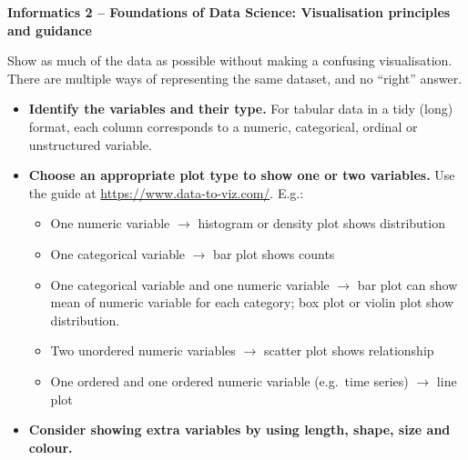 \documentclass[10pt]{article}
\newlength{\calloutparindent}
\newenvironment{callout}[2][standard]{
  \setlength{\calloutparindent}{\parindent}
  \begin{tcolorbox}[enhanced jigsaw,
    leftrule=.15mm, toprule=.15mm,
    colframe=quarto-callout-#1-color-frame, opacityback=0,
    colback=white, coltitle=black, rightrule=.15mm, breakable,
    colbacktitle=quarto-callout-#1-color!10!white,
    opacitybacktitle=0.6, titlerule=0mm, left=1mm,right=1mm,
    title=\textcolor{quarto-callout-#1-color}{\expandafter\csname
      quartocallout#1icon\endcsname}{\textbf{#2}},
    bottomrule=.15mm, toptitle=1mm, arc=.35mm, bottomtitle=1mm,
    before=\par\medskip]%
    \setlength{\parindent}{\calloutparindent}\noindent\ignorespaces}%
  {\end{tcolorbox}}
\newcommand{\principle}[3]{\begin{callout}{#1}\raggedright#2\tcblower\raggedright#3\end{callout}}
\begin{document}
\thispagestyle{fancy}
\raggedright
\pagestyle{empty}

\begin{center}
  \large\textbf{Informatics 2 -- Foundations of Data Science: Visualisation
    principles and guidance}
\end{center}


\begin{multicols}{3}
  \principle{Principle 1: Show the data}%
  {Show as much of the data as possible without making a confusing
    visualisation. There are multiple ways of representing the same
    dataset, and no ``right'' answer.}%
{\begin{itemize}[itemsep=1ex]
\item \textbf{Identify the variables and their type.} For tabular data
  in a tidy (long) format, each column corresponds to a numeric,
  categorical, ordinal or unstructured variable.
\item
  \textbf{Choose an appropriate plot type to show one or two
    variables.}
  Use the guide at \url{https://www.data-to-viz.com/}. E.g.:
  \begin{itemize}[topsep=0pt]
  \item One numeric variable $\rightarrow$ histogram or density plot
    shows distribution
  \item One categorical variable $\rightarrow$ bar plot
    shows counts
  \item One categorical variable and one numeric variable
    $\rightarrow$ bar plot can show mean of numeric variable for each
    category; box plot or violin plot show distribution.
  \item Two unordered numeric variables $\rightarrow$ scatter plot
    shows relationship
  \item One ordered and one ordered numeric variable (e.g.~time series)
    $\rightarrow$ line plot
  \end{itemize}
\item
  \textbf{Consider showing extra variables by using length, shape,
    size and colour.}
  \begin{itemize}

\end{itemize}
\end{itemize}}
\end{multicols}
\end{document}
